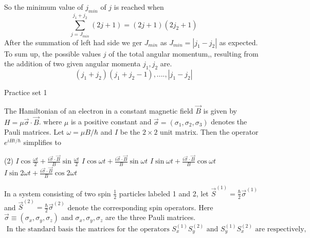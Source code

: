 So the minimum value of $j_{min}$ of $j$ is reached when 
$$ \sum_{j=J_{min}}^{j_1+j_2}(2j+1)=(2j+1)(2j_2+1)$$
After the summation of left had side we ger $J_{min}$ as $J_{min}=|j_1-j_2|$ as expected.\\
To sum up, the possible values $j$ of the total angular momentum,, resulting from the addition of two given angular momenta $j_1,j_2$ are.
$$(j_1+j_2)(j_1+j_2-1),....,|j_1-j_2|$$
\newpage 
\begin{abox}
	Practice set 1
	\end{abox}
\begin{enumerate}
	\begin{minipage}{\textwidth}
	\item The Hamiltonian of an electron in a constant magnetic field $\vec{B}$ is given by $H=\mu \vec{\sigma} \cdot \vec{B}$. where $\mu$ is a positive constant and $\vec{\sigma}=\left(\sigma_{1}, \sigma_{2}, \sigma_{3}\right)$ denotes the Pauli matrices. Let $\omega=\mu B / \hbar$ and $I$ be the $2 \times 2$ unit matrix. Then the operator $e^{i H t / \hbar}$ simplifies to
\end{minipage}
\begin{tasks}(2)
	\task[\textbf{A.}] $I \cos \frac{\omega t}{2}+\frac{i \vec{\sigma} \cdot \vec{B}}{B} \sin \frac{\omega t}{2}$
	\task[\textbf{B.}]$I \cos \omega t+\frac{i \vec{\sigma} \cdot \vec{B}}{B} \sin \omega t$
	\task[\textbf{C.}]$I \sin \omega t+\frac{i \vec{\sigma} \cdot \vec{B}}{B} \cos \omega t$
	\task[\textbf{D.}]$I \sin 2 \omega t+\frac{i \vec{\sigma} \cdot \vec{B}}{B} \cos 2 \omega t$
\end{tasks}
\begin{minipage}{\textwidth}
	\item  In a system consisting of two spin $\frac{1}{2}$ particles labeled 1 and 2, let $\vec{S}^{(1)}=\frac{\hbar}{2} \vec{\sigma}^{(1)}$ and $\vec{S}^{(2)}=\frac{\hbar}{2} \vec{\sigma}^{(2)}$ denote the corresponding spin operators. Here $\vec{\sigma} \equiv\left(\sigma_{x}, \sigma_{y}, \sigma_{z}\right)$ and $\sigma_{x}, \sigma_{y}, \sigma_{z}$ are the three Pauli matrices.\\
	$\text { In the standard basis the matrices for the operators } S_{x}^{(1)} S_{y}^{(2)} \text { and } S_{y}^{(1)} S_{x}^{(2)} \text { are respectively, }$
\end{minipage}
\end{enumerate}
